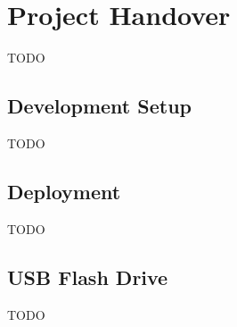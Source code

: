 \documentclass[11pt]{article} %
\begin{document}
\section{Project Handover}

TODO

\subsection{Development Setup}

TODO

\subsection{Deployment}

TODO

\subsection{USB Flash Drive}

TODO
\end{document}
